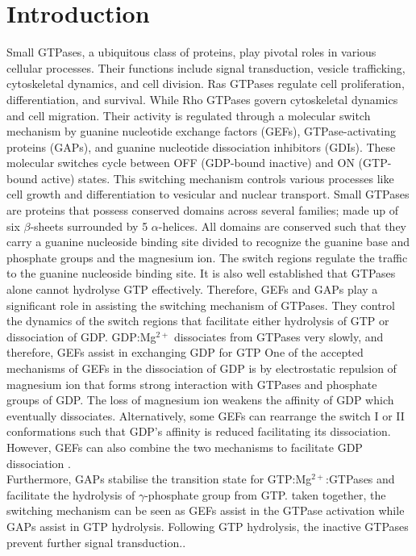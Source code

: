 \documentclass[12pt, a4paper]{achemso}
\begin{document}
\section{Introduction}
    Small GTPases, a ubiquitous class of proteins, play pivotal roles in various cellular processes. Their functions include signal transduction, vesicle trafficking, cytoskeletal dynamics, and cell division. Ras GTPases regulate cell proliferation, differentiation, and survival. While Rho GTPases govern cytoskeletal dynamics and cell migration.  Their activity is regulated through a molecular switch mechanism by guanine nucleotide exchange factors (GEFs), GTPase-activating proteins (GAPs), and guanine nucleotide dissociation inhibitors (GDIs)\cite{cherfils2013regulation}. These molecular switches cycle between OFF (GDP-bound inactive) and ON (GTP-bound active) states. This switching mechanism controls various processes like cell growth and differentiation to vesicular and nuclear transport\cite{cherfils2013regulation, loirand2013small}. 
    Small GTPases are proteins that possess conserved domains across several families; made up of six $\beta$-sheets surrounded by 5 $\alpha$-helices. All domains are conserved such that they carry a guanine nucleoside binding site divided to recognize the guanine base and phosphate groups and the magnesium ion\cite{toma2019structural, cherfils2013regulation}. The switch regions regulate the traffic to the guanine nucleoside binding site. It is also well established that GTPases alone cannot hydrolyse GTP effectively. Therefore,  GEFs and GAPs play a significant role in assisting the switching mechanism of GTPases. They control the dynamics of the switch regions that facilitate either hydrolysis of GTP or dissociation of GDP. GDP:Mg$^{2+}$ dissociates from GTPases very slowly, and therefore, GEFs assist in exchanging GDP for GTP One of the accepted mechanisms of GEFs in the dissociation of GDP is by electrostatic repulsion of magnesium ion that forms strong interaction with GTPases and phosphate groups of GDP. The loss of magnesium ion weakens the affinity of GDP which eventually dissociates. Alternatively, some GEFs can rearrange the switch I or II conformations such that GDP's affinity is reduced facilitating its dissociation. However, GEFs can also combine the two mechanisms to facilitate GDP dissociation \cite{cherfils1999gefs, cherfils2014gefs}. \\ 
    Furthermore, GAPs stabilise the transition state for GTP:Mg$^{2+}$:GTPases and facilitate the hydrolysis of $\gamma$-phosphate group from GTP. taken together, the switching mechanism can be seen as GEFs assist in the GTPase activation while GAPs assist in GTP hydrolysis. Following GTP hydrolysis, the inactive GTPases prevent further signal transduction.\cite{bos2007gefs}. 
\end{document}
